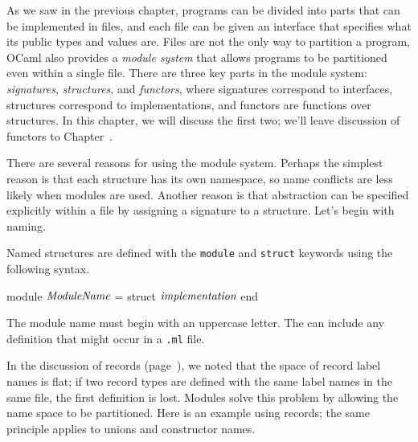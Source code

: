 %
%
%


As we saw in the previous chapter, programs can be divided into parts
that can be implemented in files, and each file can be given an
interface that specifies what its public types and values are. Files
are not the only way to partition a program, OCaml also provides
a \emph{module system} that allows programs to be partitioned even
within a single file. There are three key parts in the module
system: \emph{signatures}, \emph{structures}, and \emph{functors},
where signatures correspond to interfaces, structures correspond to
implementations, and functors are functions over structures. In this
chapter, we will discuss the first two; we'll leave discussion of
functors to Chapter~.

There are several reasons for using the module system. Perhaps the
simplest reason is that each structure has its own namespace, so name
conflicts are less likely when modules are used.  Another reason is
that abstraction can be specified explicitly within a file by
assigning a signature to a structure.  Let's begin with naming.


\label{keyword:module}
\label{keyword:struct}
Named structures are defined with the \lstinline{module} and
\lstinline{struct} keywords using the following syntax.

\begin{ocaml}
module $\textit{\rmfamily ModuleName}$ = struct $\textit{\rmfamily implementation}$ end
\end{ocaml}
%
The module name  must begin with an uppercase
letter.  The  can include any definition
that might occur in a \hbox{\lstinline/.ml/} file.

In the discussion of records (page~\pageref{section:record-labels}), we
noted that the space of record label names is flat; if two record
types are defined with the same label names in the same file, the
first definition is lost.  Modules solve this problem by allowing the
name space to be partitioned.  Here is an example using records; the
same principle applies to unions and constructor names.

